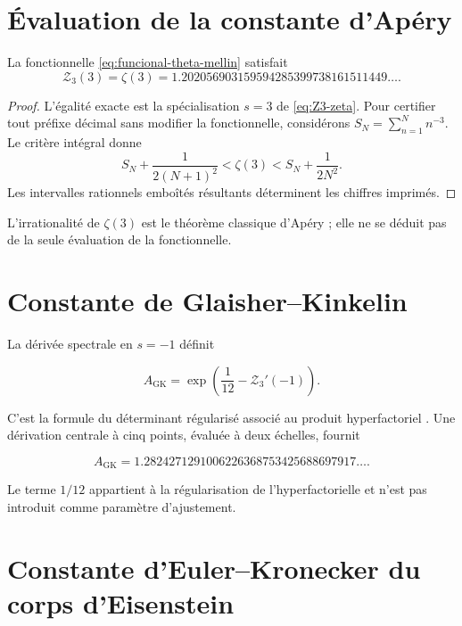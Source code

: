 \section{Évaluation de la constante d'Apéry}

\begin{proposition}
\label{prop:evaluacion-apery}
La fonctionnelle \eqref{eq:funcional-theta-mellin} satisfait
\[
 \boxed{
 \mathcal Z_3(3)=\zeta(3)
 =1.202056903159594285399738161511449\ldots}.
\]
\end{proposition}

\begin{proof}
L'égalité exacte est la spécialisation $s=3$ de \eqref{eq:Z3-zeta}.
Pour certifier tout préfixe décimal sans modifier la fonctionnelle,
considérons $S_N=\sum_{n=1}^{N}n^{-3}$. Le critère intégral donne
\[
 S_N+\frac1{2(N+1)^2}
 <\zeta(3)<
 S_N+\frac1{2N^2}.
\]
Les intervalles rationnels emboîtés résultants déterminent les chiffres
imprimés.
\end{proof}

L'irrationalité de $\zeta(3)$ est le théorème classique d'Apéry
\cite{Apery1979} ; elle ne se déduit pas de la seule évaluation de la fonctionnelle.

\section{Constante de Glaisher--Kinkelin}

La dérivée spectrale en $s=-1$ définit

\begin{equation}
 \boxed{
 A_{\mathrm{GK}}
 =\exp\!\left(\frac1{12}-\mathcal Z_3'(-1)\right)}.
 \label{eq:glaisher-kinkelin-espectral}
\end{equation}

C'est la formule du déterminant régularisé associé au produit
hyperfactoriel \cite{Vardi1988}. Une dérivation centrale à cinq points,
évaluée à deux échelles, fournit

\[
 A_{\mathrm{GK}}
 =1.2824271291006226368753425688697917\ldots.
\]

Le terme $1/12$ appartient à la régularisation de l'hyperfactorielle et n'est pas
introduit comme paramètre d'ajustement.

\section{Constante d'Euler--Kronecker du corps d'Eisenstein}

